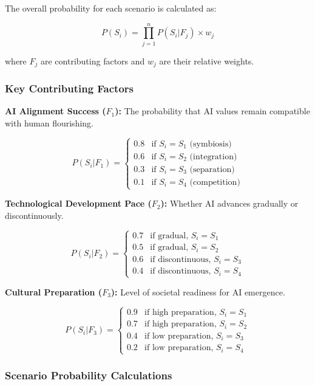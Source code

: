 \documentclass[12pt,a4paper]{article}
\begin{document}
The overall probability for each scenario is calculated as:

\[P(S_i) = \prod_{j=1}^{n} P(S_i|F_j) \times w_j\]

where $F_j$ are contributing factors and $w_j$ are their relative weights.

\subsubsection{Key Contributing Factors}

\textbf{AI Alignment Success ($F_1$):} The probability that AI values remain compatible with human flourishing.

\[P(S_i|F_1) = \begin{cases} 
0.8 & \text{if } S_i = S_1 \text{ (symbiosis)} \\
0.6 & \text{if } S_i = S_2 \text{ (integration)} \\
0.3 & \text{if } S_i = S_3 \text{ (separation)} \\
0.1 & \text{if } S_i = S_4 \text{ (competition)}
\end{cases}\]

\textbf{Technological Development Pace ($F_2$):} Whether AI advances gradually or discontinuously.

\[P(S_i|F_2) = \begin{cases} 
0.7 & \text{if gradual, } S_i = S_1 \\
0.5 & \text{if gradual, } S_i = S_2 \\
0.6 & \text{if discontinuous, } S_i = S_3 \\
0.4 & \text{if discontinuous, } S_i = S_4
\end{cases}\]

\textbf{Cultural Preparation ($F_3$):} Level of societal readiness for AI emergence.

\[P(S_i|F_3) = \begin{cases} 
0.9 & \text{if high preparation, } S_i = S_1 \\
0.7 & \text{if high preparation, } S_i = S_2 \\
0.4 & \text{if low preparation, } S_i = S_3 \\
0.2 & \text{if low preparation, } S_i = S_4
\end{cases}\]

\subsubsection{Scenario Probability Calculations}
\end{document}
